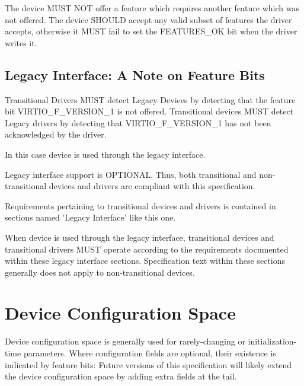 The device MUST NOT offer a feature which requires another feature
which was not offered.  The device SHOULD accept any valid subset
of features the driver accepts, otherwise it MUST fail to set the
FEATURES_OK  bit when the driver writes it.

\subsection{Legacy Interface: A Note on Feature
Bits}\label{sec:Basic Facilities of a Virtio Device / Feature
Bits / Legacy Interface: A Note on Feature Bits}

Transitional Drivers MUST detect Legacy Devices by detecting that
the feature bit VIRTIO_F_VERSION_1 is not offered.
Transitional devices MUST detect Legacy drivers by detecting that
VIRTIO_F_VERSION_1 has not been acknowledged by the driver.

In this case device is used through the legacy interface.

Legacy interface support is OPTIONAL.
Thus, both transitional and non-transitional devices and
drivers are compliant with this specification.

Requirements pertaining to transitional devices and drivers
is contained in sections named 'Legacy Interface' like this one.

When device is used through the legacy interface, transitional
devices and transitional drivers MUST operate according to the
requirements documented within these legacy interface sections.
Specification text within these sections generally does not apply
to non-transitional devices.

\section{Device Configuration Space}\label{sec:Basic Facilities of a Virtio Device / Device Configuration Space}

Device configuration space is generally used for rarely-changing or
initialization-time parameters.  Where configuration fields are
optional, their existence is indicated by feature bits: Future
versions of this specification will likely extend the device
configuration space by adding extra fields at the tail.

